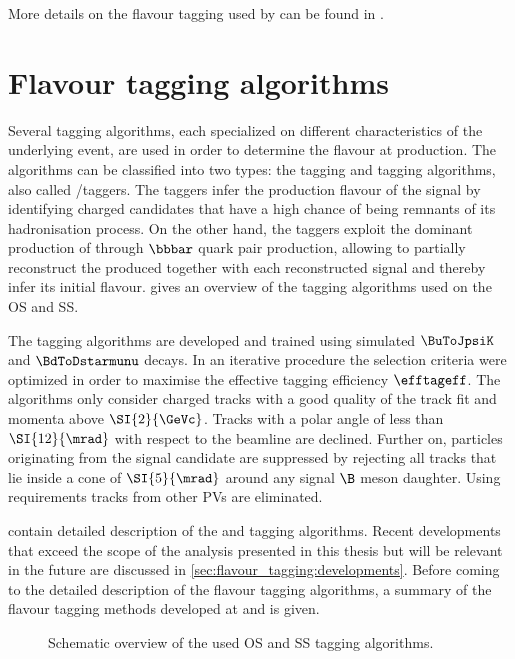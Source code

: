 More details on the flavour tagging used by \LHCb can be found in
\cite{Aaij:2012mu}.

\section{Flavour tagging algorithms}
\label{sec:flavour_tagging:lhcb}

Several tagging algorithms, each specialized on different characteristics of the
underlying event, are used in order to determine the \Bmeson flavour at
production. The algorithms can be classified into two types: the \SS tagging and
\OS tagging algorithms, also called \SS/\OS taggers. The \SS taggers infer the
production flavour of the signal \Bmeson by identifying charged candidates
that have a high chance of being remnants of its hadronisation process. On the
other hand, the \OS taggers exploit the dominant production of \Bmesons
through $\bbbar$ quark pair production, allowing to partially reconstruct the
\bhadron produced together with each reconstructed signal \Bmeson and
thereby infer its initial flavour. 
gives an overview of the tagging algorithms used on the \acl{OS} and \acl{SS}.

The tagging algorithms are developed and trained using simulated $\BuToJpsiK$
and $\BdToDstarmunu$ decays. In an iterative procedure the selection criteria
were optimized in order to maximise the effective tagging efficiency
$\efftageff$. The algorithms only consider charged tracks with a good quality
of the track fit and momenta above $\SI{2}{\GeVc}$. Tracks with a polar angle of
less than $\SI{12}{\mrad}$ with respect to the beamline are declined. Further
on, particles originating from the signal candidate are suppressed by rejecting
all tracks that lie inside a cone of $\SI{5}{\mrad}$ around any signal $\B$
meson daughter. Using \IP requirements tracks from other \acp{PV} are
eliminated.

 contain detailed
description of the \OS and \SS tagging algorithms. Recent developments that
exceed the scope of the analysis presented in this thesis but will be relevant
in the future are discussed in \cref{sec:flavour_tagging:developments}. Before
coming to the detailed description of the \LHCb flavour tagging algorithms, a
summary of the flavour tagging methods developed at \Babar and \Belle is given.

\begin{figure}
\centering

\caption{Schematic overview of the used \acs*{OS} and \acs*{SS} tagging
algorithms. \cite{wishahi:2013jt}}
\label{fig:flavour_tagging:lhcb:schematics}
\end{figure}

